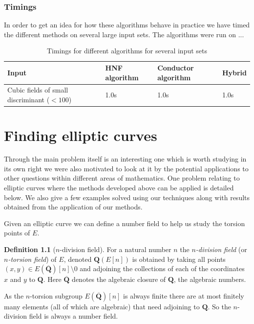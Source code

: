 \documentclass[12pt,a4paper,abstracton,bibtotoc]{scrreprt}
\theoremstyle{definition}
\newtheorem{defn}{Definition}
\newcommand{\QQ}{\mathbf{Q}}
\begin{document}
\subsection{Timings}
In order to get an idea for how these algorithms behave in practice we have timed the different methods on several large input sets.
The algorithms were run on ...
\begin{table}[H]
\begin{tabular}{|p{14em}|l|l|l|}
\hline
Input & HNF algorithm & Conductor algorithm & Hybrid \\
\hline
Cubic fields of small discriminant ($< 100$) & 1.0s & 1.0s & 1.0s \\
\hline
\end{tabular}
\caption{\label{tab:timings} Timings for different algorithms for several input sets}
\end{table}


\chapter{Finding elliptic curves}
\label{chap:ellapp}
Through the main problem itself is an interesting one which is worth studying in its own right we were also motivated to look at it by the potential applications to other questions within different areas of mathematics.
One problem relating to elliptic curves where the methods developed above can be applied is detailed below.
We also give a few examples solved using our techniques along with results obtained from the application of our methods.

Given an elliptic curve we can define a number field to help us study the torsion points of $E$.

\begin{defn}[$n$-division field] %
For a natural number $n$ the \emph{$n$-division field} (or \emph{$n$-torsion field}) of $E$, denoted $\QQ(E[n])$ is obtained by taking all points $(x,y) \in E(\overline{\QQ})[n]\setminus 0$ and adjoining the collections of each of the coordinates $x$ and $y$ to $\QQ$.
Here $\overline{\QQ}$ denotes the algebraic closure of $\QQ$, the algebraic numbers. %
\end{defn}
As the $n$-torsion subgroup $E(\overline{\QQ})[n]$ is always finite there are at most finitely many elements (all of which are algebraic) that need adjoining to $\QQ$.
So the $n$-division field is always a number field. %
\end{document}
